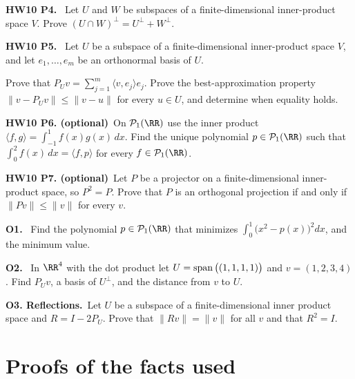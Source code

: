\documentclass[10pt]{scrartcl}
\newcommand{\ip}[2]{\langle #1,#2\rangle}
\begin{document}
\begin{prob}
\textbf{HW10 P4. }\ Let $U$ and $W$ be subspaces of a finite-dimensional inner-product space $V$. Prove $(U\cap W)^\perp=U^\perp+W^\perp$.
\end{prob}

\begin{prob}
\textbf{HW10 P5. }\ Let $U$ be a subspace of a finite-dimensional inner-product space $V$, and let $e_1,\dots,e_m$ be an orthonormal basis of $U$.
\begin{enumerate}[(a)]
  \ii Prove that $P_Uv=\sum_{j=1}^m\ip v{e_j}e_j$.
  \ii Prove the best-approximation property $\|v-P_Uv\|\le\|v-u\|$ for every $u\in U$, and determine when equality holds.
\end{enumerate}
\end{prob}

\begin{prob}
\textbf{HW10 P6. (optional)}\ On $\PP_1(\RR)$ use the inner product $\ip fg=\int_{-1}^1f(x)g(x)\,dx$. Find the unique polynomial $p\in\PP_1(\RR)$ such that $\int_0^2f(x)\,dx=\ip fp$ for every $f\in\PP_1(\RR)$.
\end{prob}

\begin{prob}
\textbf{HW10 P7. (optional)}\ Let $P$ be a projector on a finite-dimensional inner-product space, so $P^2=P$. Prove that $P$ is an orthogonal projection if and only if $\|Pv\|\le\|v\|$ for every $v$.
\end{prob}

\begin{prob}
\textbf{O1. }\ Find the polynomial $p\in\PP_1(\RR)$ that minimizes $\int_0^1\big(x^2-p(x)\big)^2dx$, and the minimum value.
\end{prob}

\begin{prob}
\textbf{O2. }\ In $\RR^4$ with the dot product let $U=\operatorname{span}\big((1,1,1,1)\big)$ and $v=(1,2,3,4)$. Find $P_Uv$, a basis of $U^\perp$, and the distance from $v$ to $U$.
\end{prob}

\begin{prob}
\textbf{O3. Reflections.}\ Let $U$ be a subspace of a finite-dimensional inner product space and $R=I-2P_U$. Prove that $\|Rv\|=\|v\|$ for all $v$ and that $R^2=I$.
\end{prob}


\section{Proofs of the facts used}
\end{document}
